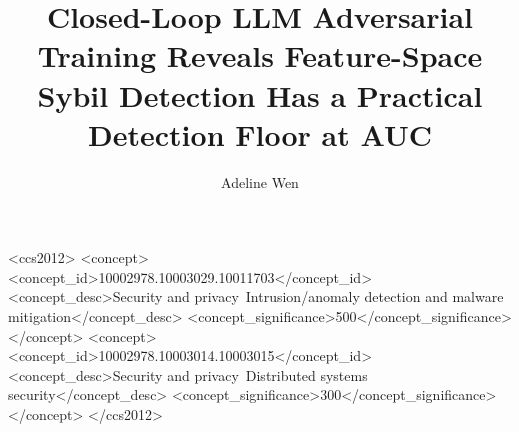\documentclass[sigconf,nonacm=false]{acmart}
\begin{document}
\title{Closed-Loop LLM Adversarial Training Reveals Feature-Space Sybil Detection Has a Practical Detection Floor at AUC \bestResponseAucFloorMean{}}
\author{Adeline Wen}

\begin{CCSXML}
<ccs2012>
<concept>
<concept_id>10002978.10003029.10011703</concept_id>
<concept_desc>Security and privacy~Intrusion/anomaly detection and malware mitigation</concept_desc>
<concept_significance>500</concept_significance>
</concept>
<concept>
<concept_id>10002978.10003014.10003015</concept_id>
<concept_desc>Security and privacy~Distributed systems security</concept_desc>
<concept_significance>300</concept_significance>
</concept>
</ccs2012>
\end{CCSXML}


\end{document}
